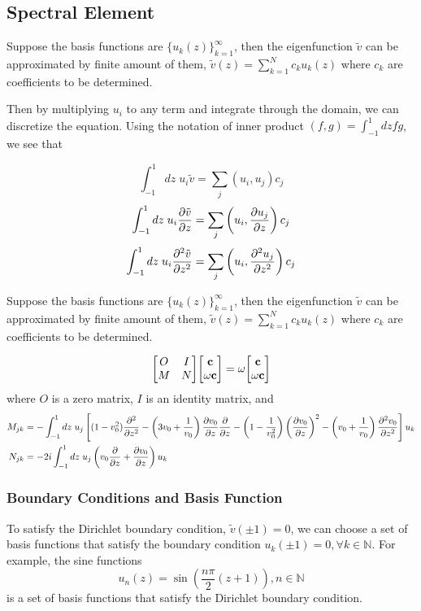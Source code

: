 \subsection{Spectral Element}
Suppose the basis functions are $\{u_k(z)\}_{k=1}^\infty$, then the eigenfunction $\tilde{v}$ can be approximated by finite amount of them, $\tilde{v}(z) = \sum_{k=1}^N c_ku_k(z)$ where $c_k$ are coefficients to be determined.

Then by multiplying $u_{i}$ to any term and integrate through the domain, we can discretize the equation. Using the notation of inner product $(f,g)=\int_{-1}^{1} dz fg$, we see that

\[ \int_{-1}^{1} dz \; u_i\tilde{v} = \sum_{j}(u_i,u_j)c_j \]
\[ \int_{-1}^{1} dz \; u_i\pdv{\tilde{v}}{z} = \sum_{j}\left(u_i,\pdv{u_j}{z}\right)c_j \]
\[ \int_{-1}^{1} dz \; u_i\pdv[2]{\tilde{v}}{z} = \sum_{j}\left(u_i,\pdv[2]{u_j}{z}\right)c_j \]

Suppose the basis functions are $\{u_k(z)\}_{k=1}^\infty$, then the eigenfunction $\tilde{v}$ can be approximated by finite amount of them, $\tilde{v}(z) = \sum_{k=1}^N c_ku_k(z)$ where $c_k$ are coefficients to be determined.

\begin{equation} \label{eq:eigenvalue-problem-SE}
	\mqty[ O & I\\ M & N ]\mqty[ \mathbf{c}\\ \omega\mathbf{c} ] = \omega\mqty[ \mathbf{c}\\ \omega\mathbf{c} ]
\end{equation}
where $O$ is a zero matrix, $I$ is an identity matrix, and
\begin{align*}
	M_{jk} &= -\int_{-1}^{1}dz \; u_{j} \left[(1-v_0^2)\pdv[2]{}{z} 
	-\left(3v_0 + \frac{1}{v_0}\right)\pdv{v_0}{z}\pdv{}{z} 
	- \left(1-\frac{1}{v_0^2}\right)\left(\pdv{v_0}{z}\right)^2 
	- \left(v_0+\frac{1}{v_0}\right)\pdv[2]{v_0}{z}\right] u_{k} \\
	N_{jk} &= -2i\int_{-1}^{1}dz \; u_{j}\left(v_0\pdv{}{z} +\pdv{v_0}{z} \right)u_{k}
\end{align*}

\subsubsection{Boundary Conditions and Basis Function}
To satisfy the Dirichlet boundary condition, $\tilde{v}(\pm 1)=0$, we can choose a set of basis functions that satisfy the boundary condition $u_k(\pm 1)=0,\forall k\in\mathbb{N}$. For example, the sine functions
\[ u_n(z) = \sin(\frac{n\pi}{2}(z+1)), n\in\mathbb{N} \]
is a set of basis functions that satisfy the Dirichlet boundary condition.



